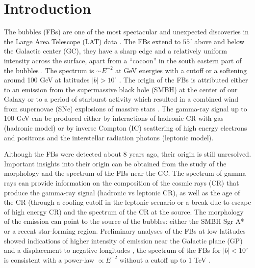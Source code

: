 \section{Introduction}



The \Fermi bubbles (FBs) are one of the most spectacular and unexpected discoveries 
in the \Fermi Large Area Telescope (LAT) data \citep{2010ApJ...724.1044S}.
The FBs extend to $55^\circ$ above and below the Galactic center (GC),
they have a sharp edge and a relatively uniform intensity across the surface, apart from a ``cocoon'' in the south eastern part of the bubbles
\citep{2012ApJ...753...61S, 2014ApJ...793...64A}.
The spectrum is $\sim E^{-2}$ at GeV energies with a cutoff or a softening around 100 GeV at latitudes $|b| > 10^\circ$ \citep{2014ApJ...793...64A}.
The origin of the FBs is attributed either to an emission from the supermassive black hole (SMBH) at
the center of our Galaxy %
or to a period of starburst activity which resulted in a combined wind
from supernovae (SNe) explosions of massive stars %
\citep[for a review see][]{2010ApJ...711..818S}.
The gamma-ray signal up to 100 GeV can be produced either by interactions of hadronic CR with gas (hadronic model)
or by inverse Compton (IC) scattering of high energy electrons and positrons and the interstellar radiation photons (leptonic model).

Although the FBs were detected about 8 years ago, their origin is still unresolved.
Important insights into their origin can be obtained from the study of the morphology and the spectrum of the FBs near the GC.
The spectrum of gamma rays can provide information on the composition of the 
cosmic rays (CR) that produce the gamma-ray signal (hadronic vs leptonic CR),
as well as the age of the CR (through a cooling cutoff in the leptonic scenario or a break due to escape of high energy CR)
and the spectrum of the CR at the source.
The morphology of the emission can point to the source of the bubbles: either the SMBH Sgr A* or a recent star-forming region.
Preliminary analyses of the FBs at low latitudes showed indications of higher intensity of emission near the Galactic plane (GP) and a displacement
to negative longitudes \citep{2016ApJS..223...26A, 2017ApJ...840...43A},
the spectrum of the FBs for $|b| < 10^\circ$ is consistent with a power-law $\propto E^{-2}$ 
without a cutoff up to 1 TeV \citep{2017ApJ...840...43A}.

